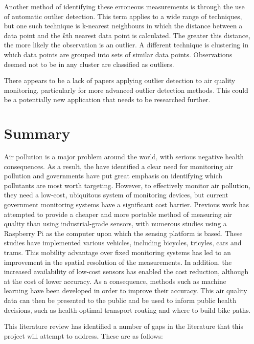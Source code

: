 \documentclass[11pt,twosided,a4paper]{report}
\begin{document}
Another method of identifying these erroneous measurements is through the use of automatic outlier detection. This term applies to a wide range of techniques, but one such technique is k-nearest neighbours in which the distance between a data point and the $k$th nearest data point is calculated. The greater this distance, the more likely the observation is an outlier. A different technique is clustering in which data points are grouped into sets of similar data points. Observations deemed not to be in any cluster are classified as outliers.

There appears to be a lack of papers applying outlier detection to air quality monitoring, particularly for more advanced outlier detection methods. This could be a potentially new application that needs to be researched further.



\section{Summary}

Air pollution is a major problem around the world, with serious negative health consequences. As a result, the \cite{WHO2002ambientmonitoring} have identified a clear need for monitoring air pollution and governments have put great emphasis on identifying which pollutants are most worth targeting. However, to effectively monitor air pollution, they need a low-cost, ubiquitous system of monitoring devices, but current government monitoring systems have a significant cost barrier. Previous work has attempted to provide a cheaper and more portable method of measuring air quality than using industrial-grade sensors, with numerous studies using a Raspberry Pi as the computer upon which the sensing platform is based. These studies have implemented various vehicles, including bicycles, tricyles, cars and trams. This mobility advantage over fixed monitoring systems has led to an improvement in the spatial resolution of the measurements. In addition, the increased availability of low-cost sensors has enabled the cost reduction, although at the cost of lower accuracy. As a consequence, methods such as machine learning have been developed in order to improve their accuracy. This air quality data can then be presented to the public and be used to inform public health decisions, such as health-optimal transport routing and where to build bike paths.

This literature review has identified a number of gaps in the literature that this project will attempt to address. These are as follows:
\end{document}
